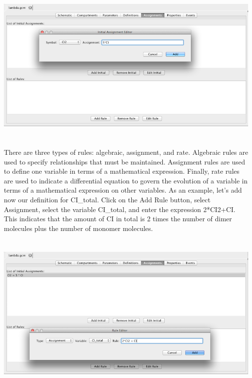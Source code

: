 \documentclass[titlepage,11pt]{article}
\begin{document}
\begin{center}
\includegraphics[height=80mm]{screenshots/initial}
\end{center}

There are three types of rules: algebraic, assignment, and rate.  Algebraic rules are used to specify relationships that must be maintained.  Assignment rules are used to define one variable in terms of a mathematical expression.  Finally, rate rules are used to indicate a differential equation to govern the evolution of a variable in terms of a mathematical expression on other variables.  As an example, let's add now our definition for CI\_total.  Click on the Add Rule button, select Assignment, select the variable CI\_total, and enter the expression 2*CI2+CI.  This indicates that the amount of CI in total is 2 times the number of dimer molecules plus the number of monomer molecules.

\begin{center}
\includegraphics[height=80mm]{screenshots/rule}
\end{center}
\end{document}
